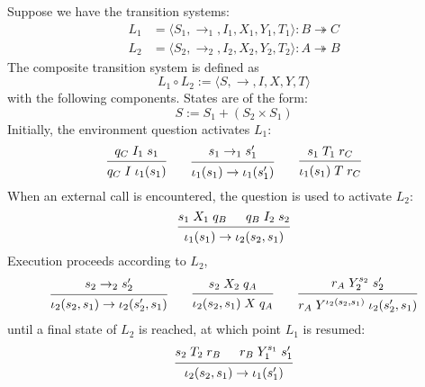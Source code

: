 \documentclass[sigplan,10pt,authordraft]{acmart}
\begin{document}
\begin{definition} %
Suppose we have the transition systems:
\begin{align*}
  L_1 &= \langle S_1, {\rightarrow_1}, I_1, X_1, Y_1, T_1 \rangle
    : B \twoheadrightarrow C
  \\
  L_2 &= \langle S_2, {\rightarrow_2}, I_2, X_2, Y_2, T_2 \rangle
    : A \twoheadrightarrow B
\end{align*}
The composite transition system is defined as
\[
  L_1 \circ L_2 :=
  \langle S, {\rightarrow}, I, X, Y, T \rangle
\]
with the following components.
States are of the form:
\[
    S := S_1 + (S_2 \times S_1)
\]
Initially, the environment question activates $L_1$:
\[
  \begin{prooftree}
    \hypo{q_C \mathrel{I_1} s_1}
    \infer1{q_C \mathrel{I} \iota_1(s_1)}
  \end{prooftree}
  \qquad
  \begin{prooftree}
    \hypo{s_1 \rightarrow_1 s_1'}
    \infer1{\iota_1(s_1) \rightarrow \iota_1(s_1')}
  \end{prooftree}
  \qquad
  \begin{prooftree}
    \hypo{s_1 \mathrel{T_1} r_C}
    \infer1{\iota_1(s_1) \mathrel{T} r_C}
  \end{prooftree}
\]
When an external call is encountered,
the question is used to activate $L_2$:
\[
  \begin{prooftree}
    \hypo{s_1 \mathrel{X_1} q_B}
    \hypo{q_B \mathrel{I_2} s_2}
    \infer2{\iota_1(s_1) \rightarrow \iota_2(s_2, s_1)}
  \end{prooftree}
\]
Execution proceeds according to $L_2$,
\[
  \begin{prooftree}
    \hypo{s_2 \rightarrow_2 s_2'}
    \infer1{\iota_2(s_2, s_1) \rightarrow \iota_2(s_2', s_1)}
  \end{prooftree}
  \qquad
  \begin{prooftree}
    \hypo{s_2 \mathrel{X_2} q_A}
    \infer1{\iota_2(s_2, s_1) \mathrel{X} q_A}
  \end{prooftree}
  \qquad
  \begin{prooftree}
    \hypo{r_A \mathrel{Y_2^{s_2}} s_2'}
    \infer1{r_A \mathrel{Y^{\iota_2(s_2, s_1)}} \iota_2(s_2', s_1)}
  \end{prooftree}
\]
until a final state of $L_2$ is reached,
at which point $L_1$ is resumed:
\[
  \begin{prooftree}
    \hypo{s_2 \mathrel{T_2} r_B}
    \hypo{r_B \mathrel{Y_1^{s_1}} s_1'}
    \infer2{\iota_2(s_2, s_1) \rightarrow \iota_1(s_1')}
  \end{prooftree}
\]
\end{definition}
\end{document}
